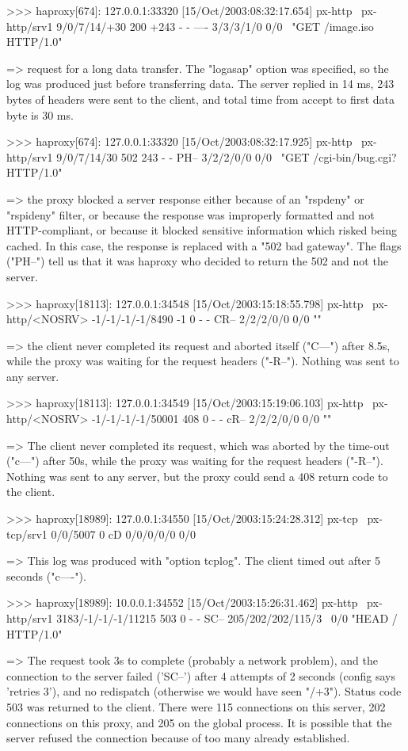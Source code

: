     >>> haproxy[674]: 127.0.0.1:33320 [15/Oct/2003:08:32:17.654] px-http \
          px-http/srv1 9/0/7/14/+30 200 +243 - - ---- 3/3/3/1/0 0/0 \
          "GET /image.iso HTTP/1.0"

    => request for a long data transfer. The "logasap" option was specified, so
       the log was produced just before transferring data. The server replied in
       14 ms, 243 bytes of headers were sent to the client, and total time from
       accept to first data byte is 30 ms.

    >>> haproxy[674]: 127.0.0.1:33320 [15/Oct/2003:08:32:17.925] px-http \
          px-http/srv1 9/0/7/14/30 502 243 - - PH-- 3/2/2/0/0 0/0 \
          "GET /cgi-bin/bug.cgi? HTTP/1.0"

    => the proxy blocked a server response either because of an "rspdeny" or
       "rspideny" filter, or because the response was improperly formatted and
       not HTTP-compliant, or because it blocked sensitive information which
       risked being cached. In this case, the response is replaced with a "502
       bad gateway". The flags ("PH--") tell us that it was haproxy who decided
       to return the 502 and not the server.

    >>> haproxy[18113]: 127.0.0.1:34548 [15/Oct/2003:15:18:55.798] px-http \
          px-http/<NOSRV> -1/-1/-1/-1/8490 -1 0 - - CR-- 2/2/2/0/0 0/0 ""

    => the client never completed its request and aborted itself ("C---") after
       8.5s, while the proxy was waiting for the request headers ("-R--").
       Nothing was sent to any server.

    >>> haproxy[18113]: 127.0.0.1:34549 [15/Oct/2003:15:19:06.103] px-http \
         px-http/<NOSRV> -1/-1/-1/-1/50001 408 0 - - cR-- 2/2/2/0/0 0/0 ""

    => The client never completed its request, which was aborted by the
       time-out ("c---") after 50s, while the proxy was waiting for the request
       headers ("-R--").  Nothing was sent to any server, but the proxy could
       send a 408 return code to the client.

    >>> haproxy[18989]: 127.0.0.1:34550 [15/Oct/2003:15:24:28.312] px-tcp \
          px-tcp/srv1 0/0/5007 0 cD 0/0/0/0/0 0/0

    => This log was produced with "option tcplog". The client timed out after
       5 seconds ("c----").

    >>> haproxy[18989]: 10.0.0.1:34552 [15/Oct/2003:15:26:31.462] px-http \
          px-http/srv1 3183/-1/-1/-1/11215 503 0 - - SC-- 205/202/202/115/3 \
          0/0 "HEAD / HTTP/1.0"

    => The request took 3s to complete (probably a network problem), and the
       connection to the server failed ('SC--') after 4 attempts of 2 seconds
       (config says 'retries 3'), and no redispatch (otherwise we would have
       seen "/+3"). Status code 503 was returned to the client. There were 115
       connections on this server, 202 connections on this proxy, and 205 on
       the global process. It is possible that the server refused the
       connection because of too many already established.